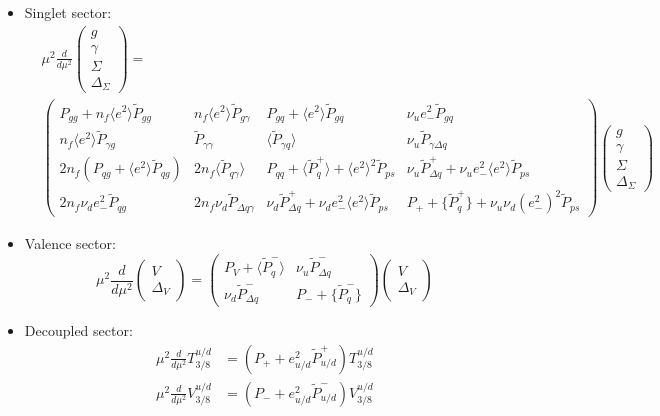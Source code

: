\documentclass[a4paper,oneside]{article}
\begin{document}
\begin{itemize}
\item Singlet sector:
\begin{align*}
&\mu^2\frac{d}{d\mu^2}
\begin{pmatrix}
g \\
\gamma \\
\Sigma \\
\Delta_\Sigma
\end{pmatrix}
= \\
&\begin{pmatrix}
 P_{gg}+n_f \langle e^2\rangle \tilde{P}_{gg} & n_f \langle e^2\rangle \tilde{P}_{g\gamma} & P_{gq} + \langle e^2\rangle \tilde{P}_{gq} & \nu_ue^2_-\tilde{P}_{gq} \\
 n_f \langle e^2\rangle \tilde{P}_{\gamma g} & \tilde{P}_{\gamma \gamma} &  \langle \tilde{P}_{\gamma q} \rangle& \nu_u \tilde{P}_{\gamma \Delta q} \\
 2n_f (P_{qg} +\langle e^2\rangle  \tilde{P}_{qg} )& 2 n_f  \langle \tilde{P}_{q \gamma} \rangle& P_{qq}+  \langle \tilde{P}^+_{q} \rangle+ \langle e^2\rangle^2\tilde{P}_{ps}& \nu_u\tilde{P}^+_{ \Delta q}+ \nu_ue_-^2\langle e^2\rangle \tilde{P}_{ps}\\
 2n_f \nu_d e^2_-\tilde{P}_{qg} & 2n_f \nu_d \tilde{P}_{\Delta q\gamma} & \nu_d\tilde{P}^+_{ \Delta q}+  \nu_d e^2_-\langle e^2\rangle \tilde{P}_{ps}& P_+ + \{ \tilde{P}^+_{q} \}+\nu_u \nu_d (e^2_-)^2\tilde{P}_{ps}
\end{pmatrix}
\begin{pmatrix}
g \\
\gamma \\
\Sigma \\
\Delta_\Sigma
\end{pmatrix}
\end{align*}

\item Valence sector:
\begin{equation*}
\mu^2\frac{d}{d\mu^2}
\begin{pmatrix}
V \\
\Delta_V
\end{pmatrix}
=
\begin{pmatrix}
P_V+\langle \tilde{P}^-_{q} \rangle & \nu_u\tilde{P}^-_{\Delta q}\\
 \nu_d\tilde{P}^-_{\Delta q}& P_-+\{ \tilde{P}^-_{q} \}
\end{pmatrix}
\begin{pmatrix}
V \\
\Delta_V
\end{pmatrix}
\end{equation*}
\item Decoupled sector:
\begin{align*}
\mu^2\frac{d}{d\mu^2}T^{u/d}_{3/8} & = (P_{+} + e_{u/d}^2 \tilde{P}^{+}_{u/d}) T^{u/d}_{3/8} \\
\mu^2\frac{d}{d\mu^2}V^{u/d}_{3/8} & = (P_{-} + e_{u/d}^2 \tilde{P}^{-}_{u/d} )V^{u/d}_{3/8}
\end{align*}
\end{itemize}
\end{document}
